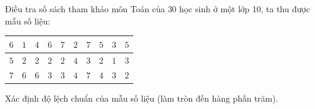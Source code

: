 \begin{ex}
Điều tra số sách tham khảo môn Toán của $30$ học sinh ở một lớp 10, ta thu được mẫu số liệu:
\begin{center}
\begin{tabular}{|c|c|c|c|c|c|c|c|c|c|}\hline
$6$ & $1$ & $4$ & $6$ & $7$ & $2$ & $7$ & $5$ & $3$ & $5$\\\hline
$5$ & $2$ & $2$ & $2$ & $2$ & $4$ & $3$ & $2$ & $1$ & $3$\\\hline
$7$ & $6$ & $6$ & $3$ & $3$ & $4$ & $7$ & $4$ & $3$ & $2$\\\hline
\end{tabular}
\end{center}
Xác định độ lệch chuẩn của mẫu số liệu (làm tròn đến hàng phần trăm).
\end{ex}

